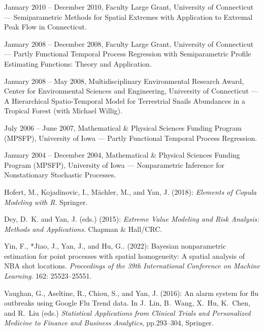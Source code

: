 \documentclass[Statistics]{vita}
\begin{document}
\begin{vita}
\begin{Grants}
\begin{Internal}
  \item January 2010 -- December 2010, Faculty Large Grant, University of Connecticut --- Semiparametric Methods for Spatial Extremes with Application to Extremal Peak Flow in Connecticut.
  \item January 2008 -- December 2008, Faculty Large Grant, University of Connecticut --- Partly Functional Temporal Process Regression with Semiparametric Profile Estimating Functions: Theory and Application.
  \item January 2008 -- May 2008, Multidisciplinary Environmental Research Award, Center for Environmental Sciences and Engineering, University of Connecticut --- A Hierarchical Spatio-Temporal Model for Terrestrial Snails Abundances in a Tropical Forest (with Michael Willig).
  \item July 2006 -- June 2007, Mathematical \& Physical Sciences Funding Program (MPSFP), University of Iowa --- Partly Functional Temporal Process Regression.
  \item January 2004 -- December 2004, Mathematical \& Physical Sciences Funding Program (MPSFP), University of Iowa --- Nonparametric Inference for Nonstationary Stochastic Processes.
  \end{Internal}
\end{Grants}
\begin{Publications}
%   
%      
  \begin{Books}
  \item Hofert, M., Kojadinovic, I., M\"achler, M., and Yan, J. (2018): {\em Elements of Copula Modeling with R\/}. Springer. 
  \item Dey, D.~K. and Yan, J. (eds.) (2015): {\em Extreme Value Modeling and Risk Analysis: Methods and Applications\/}. Chapman \& Hall/CRC.
  \end{Books}
  \begin{BookChapters}
  \item Yin, F., *Jiao, J., Yan, J., and Hu, G.. (2022): Bayesian nonparametric estimation for point processes with spatial homogeneity: A spatial analysis of NBA shot locations. {\em Proceedings of the 39th International Conference on Machine Learning}. 162: 25523--25551.
  \item *Vaughan, G., Aseltine, R., Chiou, S., and Yan, J. (2016): An alarm system for flu outbreaks using Google Flu Trend data. In J.~Lin, B.~Wang, X.~Hu, K.~Chen, and R.~Liu (eds.) {\em Statistical Applications from Clinical Trials and Personalized Medicine to Finance and Business Analytics}, pp.293--304, Springer.

\end{BookChapters}
\end{Publications}
\end{vita}
\end{document}
